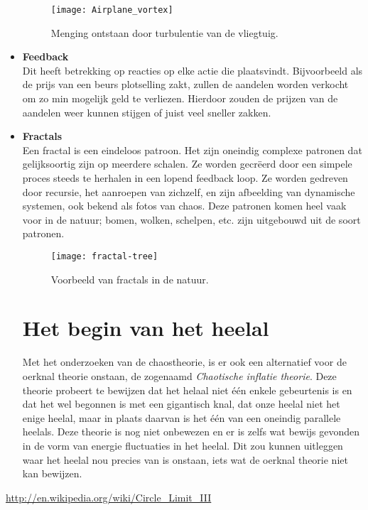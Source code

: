 \documentclass{article}
\begin{document}
\begin{itemize}
{		\begin{figure}[Hh]
			\centering
			\texttt{[image: Airplane\_vortex]}
			\caption{Menging ontstaan door turbulentie van de vliegtuig.}
		\end{figure}
	}

	\item{\textbf{Feedback} \\
		Dit heeft betrekking op reacties op elke actie die plaatsvindt. Bijvoorbeeld als de prijs van een beurs plotselling zakt, zullen de aandelen worden verkocht om zo min mogelijk geld te verliezen. Hierdoor zouden de prijzen van de aandelen weer kunnen stijgen of juist veel sneller zakken.
	}

	\item{\textbf{Fractals} \\
		Een fractal is een eindeloos patroon. Het zijn oneindig complexe patronen dat gelijksoortig zijn op meerdere schalen. Ze worden gecr\"eerd door een simpele proces steeds te herhalen in een lopend feedback loop. Ze worden gedreven door recursie, het aanroepen van zichzelf, en zijn afbeelding van dynamische systemen, ook bekend als fotos van chaos. Deze patronen komen heel vaak voor in de natuur; bomen, wolken, schelpen, etc. zijn uitgebouwd uit de soort patronen.

		\begin{figure}[Hh]
			\centering
			\texttt{[image: fractal-tree]}
			\caption{Voorbeeld van fractals in de natuur.}
		\end{figure}

	}

	\section{Het begin van het heelal}

	Met het onderzoeken van de chaostheorie, is er ook een alternatief voor de oerknal theorie onstaan, de zogenaamd \textit{Chaotische inflatie theorie}. Deze theorie probeert te bewijzen dat het helaal niet \'e\'en enkele gebeurtenis is en dat het wel begonnen is met een gigantisch knal, dat onze heelal niet het enige heelal, maar in plaats daarvan is het \'e\'en van een oneindig parallele heelals. Deze theorie is nog niet onbewezen en er is zelfs wat bewijs gevonden in de vorm van energie fluctuaties in het heelal. Dit zou kunnen uitleggen waar het heelal nou precies van is onstaan, iets wat de oerknal theorie niet kan bewijzen.

\end{itemize}

\pagebreak

\begin{thebibliography}{9}

\bibitem{}
	\url{http://en.wikipedia.org/wiki/Circle_Limit_III}
	
\end{thebibliography}
\end{document}
